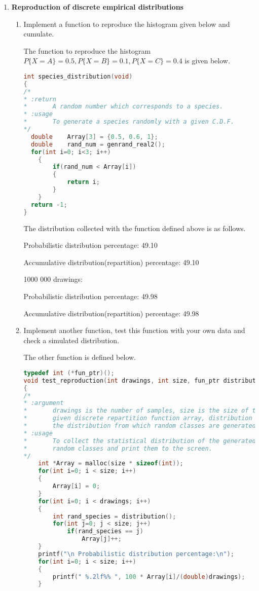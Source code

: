 \documentclass{article}
\begin{document}
\begin{enumerate}
\begin{messageshell}
\end{messageshell}
\item{\textbf{Reproduction of discrete empirical distributions}}
\begin{enumerate}[label=(\alph*)]
\item{Implement a function to reproduce the histogram given below and cumulate.}

The function to reproduce the histogram $P\{X=A\}=0.5,P\{X=B\}=0.1,P\{X=C\}=0.4$ is given below.

\begin{lstlisting}[language=C]
int species_distribution(void)
{
/*
* :return  
*       A random number which corresponds to a species.
* :usage
*       To generate a species randomly with a given C.D.F.
*/
  double    Array[3] = {0.5, 0.6, 1};
  double    rand_num = genrand_real2();
  for(int i=0; i<3; i++)
    {
        if(rand_num < Array[i])
        {
            return i;
        }
    }
  return -1;
}
\end{lstlisting}

The distribution collected with the function defined above is as follows.

\begin{messageshell}

 Probabilistic distribution percentage:
 49.10%

 Accumulative distribution(repartition) percentage:
 49.10%

 1000 000 drawings:

 Probabilistic distribution percentage:
 49.98%

 Accumulative distribution(repartition) percentage:
 49.98%
\end{messageshell}

\item{Implement another function, test this function with your own data and check a simulated distribution.}

The other function is defined below.

\begin{lstlisting}[language=C]
typedef int (*fun_ptr)();
void test_reproduction(int drawings, int size, fun_ptr distribution)
{
/*
* :argument 
*       drawings is the number of samples, size is the size of the
*       given discrete repartition function array, distribution is
*       the distribution from which random classes are generated. 
* :usage
*       To collect the statistical distribution of the generated
*       random classes and print them to the screen.
*/
    int *Array = malloc(size * sizeof(int));
    for(int i=0; i < size; i++)
    {
        Array[i] = 0;
    }
    for(int i=0; i < drawings; i++)
    {
        int rand_species = distribution();
        for(int j=0; j < size; j++)
            if(rand_species == j)
                Array[j]++;
    }
    printf("\n Probabilistic distribution percentage:\n");
    for(int i=0; i < size; i++)
    {
        printf(" %.2lf%% ", 100 * Array[i]/(double)drawings);
    }


\end{lstlisting}
\end{enumerate}
\end{enumerate}
\end{document}
